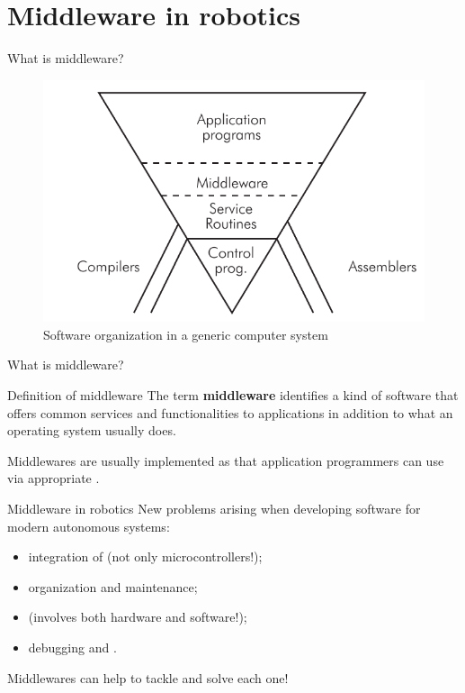 
\section{Middleware in robotics}
\graphicspath{{figs/section1/}}

\begin{frame}{What is middleware?}
	\begin{figure}
		\centering
		\includegraphics[width=.85\textwidth]{softwarePyramid.png}
		\caption{Software organization in a generic computer system}
		\label{fig:swpyramid}
	\end{figure}
\end{frame}
\begin{frame}{What is middleware?}
	\begin{block}{Definition of middleware}
		\justifying
		The term \textbf{middleware} identifies a kind of software that offers common services and functionalities to applications in addition to what an operating system usually does.
	\end{block}
	\justifying
	Middlewares are usually implemented as  that application programmers can use via appropriate .
\end{frame}

\begin{frame}{Middleware in robotics}
	\justifying
	New problems arising when developing software for modern autonomous systems:
	\begin{itemize}
		\item integration of  (not only microcontrollers!);
		\item {} organization and maintenance;
		\item {} (involves both hardware and software!);
		\item debugging and .
	\end{itemize}
	\begin{block}{}
		\centering
		Middlewares can help to tackle and solve each one!
	\end{block}
\end{frame}

